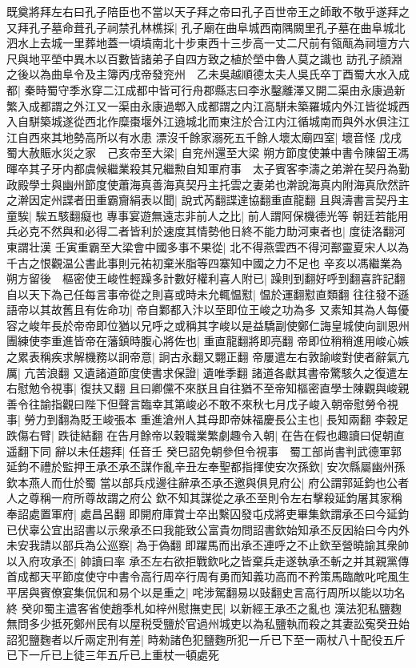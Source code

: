 既奠將拜左右曰孔子陪臣也不當以天子拜之帝曰孔子百世帝王之師敢不敬乎遂拜之又拜孔子墓命葺孔子祠禁孔林樵採|{
	孔子廟在曲阜城西南隅闕里孔子墓在曲阜城北泗水上去城一里葬地蓋一頃墳南北十步東西十三步高一丈二尺前有瓴甋為祠壇方六尺與地平塋中異木以百數皆諸弟子自四方致之植於塋中魯人莫之識也}
訪孔子顔淵之後以為曲阜令及主簿丙戌帝發兖州　乙未吳越順德太夫人吳氏卒丁酉蜀大水入成都|{
	秦時蜀守季氷穿二江成都中皆可行舟郡縣志曰李氷鑿離澤又開二渠由永康過新繁入成都謂之外江又一渠由永康過郫入成都謂之内江高駢未築羅城内外江皆從城西入自駢築城遂從西北作糜棗堰外江遶城北而東注於合江内江循城南而與外水俱注江江自西來其地勢高所以有水患}
漂沒千餘家溺死五千餘人壞太廟四室|{
	壞音怪}
戊戌蜀大赦賑水災之家　己亥帝至大梁|{
	自兖州還至大梁}
朔方節度使兼中書令陳留王馮暉卒其子牙内都虞候繼業殺其兄繼勲自知軍府事　太子賓客李濤之弟澣在契丹為勤政殿學士與幽州節度使蕭海真善海真契丹主托雲之妻弟也澣說海真内附海真欣然許之澣因定州諜者田重霸齎絹表以聞|{
	說式芮翻諜達協翻重直龍翻}
且與濤書言契丹主童騃|{
	騃五駭翻癡也}
專事宴遊無遠志非前人之比|{
	前人謂阿保機德光等}
朝廷若能用兵必克不然與和必得二者皆利於速度其情勢他日終不能力助河東者也|{
	度徒洛翻河東謂壮漢}
壬寅重霸至大梁會中國多事不果從|{
	北不得燕雲西不得河鄯靈夏宋人以為千古之恨觀温公書此事則元祐初棄米脂等四寨知中國之力不足也}
辛亥以馮繼業為朔方留後　樞密使王峻性輕躁多計數好權利喜人附已|{
	躁則到翻好呼到翻喜許記翻}
自以天下為己任每言事帝從之則喜或時未允輒愠懟|{
	愠於運翻懟直類翻}
往往發不遜語帝以其故舊且有佐命功|{
	帝自鄴都入汴以至即位王峻之功為多}
又素知其為人每優容之峻年長於帝帝即位猶以兄呼之或稱其字峻以是益驕副使鄭仁誨皇城使向訓恩州團練使李重進皆帝在藩鎮時腹心將佐也|{
	重直龍翻將即亮翻}
帝即位稍稍進用峻心嫉之累表稱疾求解機務以詗帝意|{
	詗古永翻又翾正翻}
帝屢遣左右敦諭峻對使者辭氣亢厲|{
	亢苦浪翻}
又遺諸道節度使書求保證|{
	遺唯季翻}
諸道各獻其書帝驚駭久之復遣左右慰勉令視事|{
	復扶又翻}
且曰卿儻不來朕且自往猶不至帝知樞密直學士陳觀與峻親善令往諭指觀曰陛下但聲言臨幸其第峻必不敢不來秋七月戊子峻入朝帝慰勞令視事|{
	勞力到翻為貶王峻張本}
重進滄州人其母即帝妹福慶長公主也|{
	長知兩翻}
李穀足跌傷右臂|{
	跌徒結翻}
在告月餘帝以穀職業繁劇趣令入朝|{
	在告在假也趣讀曰促朝直遥翻下同}
辭以未任趨拜|{
	任音壬}
癸巳詔免朝參但令視事　蜀工部尚書判武德軍郭延鈞不禮於監押王承丕承丕謀作亂辛丑左奉聖都指揮使安次孫欽|{
	安次縣屬幽州孫欽本燕人而仕於蜀}
當以部兵戍邊往辭承丕承丕邀與俱見府公|{
	府公謂郭延鈞也公者人之尊稱一府所尊故謂之府公}
欽不知其謀從之承丕至則令左右擊殺延鈞屠其家稱奉詔處置軍府|{
	處昌呂翻}
即開府庫賞士卒出繫囚發屯戍將吏畢集欽謂承丕曰今延鈞已伏辜公宜出詔書以示衆承丕曰我能致公富貴勿問詔書欽始知承丕反因紿曰今内外未安我請以部兵為公巡察|{
	為于偽翻}
即躍馬而出承丕連呼之不止欽至營曉諭其衆帥以入府攻承丕|{
	帥讀曰率}
承丕左右欲拒戰欽叱之皆棄兵走遂執承丕斬之并其親黨傳首成都天平節度使守中書令高行周卒行周有勇而知義功高而不矜策馬臨敵叱咤風生平居與賓僚宴集侃侃和易个以是重之|{
	咤涉駕翻易以䜴翻史言高行周所以能以功名終}
癸卯蜀主遣客省使趙季札如梓州慰撫吏民|{
	以新經王承丕之亂也}
漢法犯私鹽麴無問多少抵死鄭州民有以屋税受鹽於官過州城吏以為私鹽執而殺之其妻訟寃癸丑始詔犯鹽麴者以斤兩定刑有差|{
	時勑諸色犯鹽麴所犯一斤已下至一兩杖八十配役五斤已下一斤已上徒三年五斤已上重杖一頓處死}


